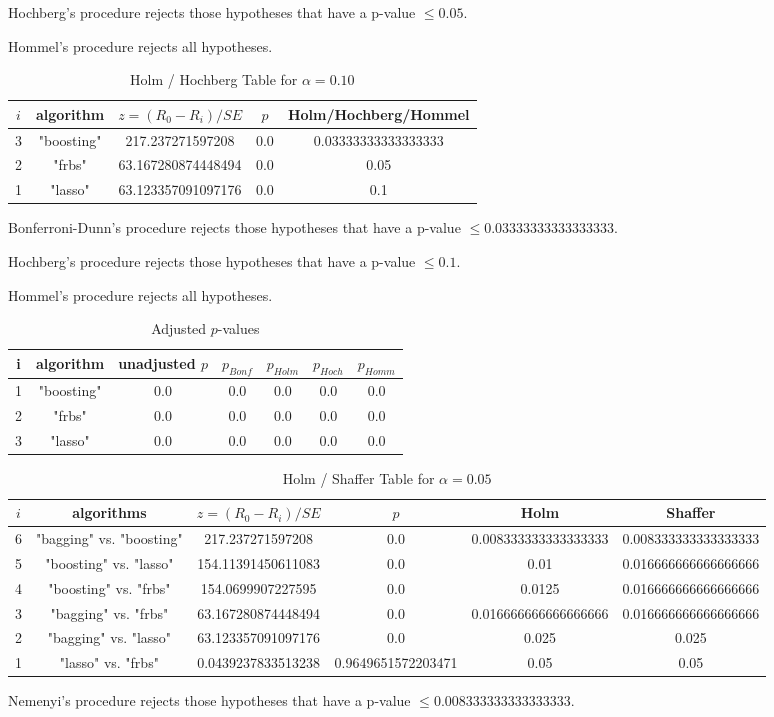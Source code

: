 \documentclass[a4paper,10pt]{article}
\begin{document}
\begin{landscape}
Hochberg's procedure rejects those hypotheses that have a p-value $\le0.05$.


Hommel's procedure rejects all hypotheses.


\begin{table}[!htp]
\centering\tiny
\caption{Holm / Hochberg Table for $\alpha=0.10$}
\begin{tabular}{ccccc}
$i$&algorithm&$z=(R_0 - R_i)/SE$&$p$&Holm/Hochberg/Hommel\\
\hline
3&"boosting"&217.237271597208&0.0&0.03333333333333333\\
2&"frbs"&63.167280874448494&0.0&0.05\\
1&"lasso"&63.123357091097176&0.0&0.1\\
\hline
\end{tabular}
\end{table}
Bonferroni-Dunn's procedure rejects those hypotheses that have a p-value $\le0.03333333333333333$.


Hochberg's procedure rejects those hypotheses that have a p-value $\le0.1$.


Hommel's procedure rejects all hypotheses.


\begin{table}[!htp]
\centering\tiny
\caption{Adjusted $p$-values}
\begin{tabular}{ccccccc}
i&algorithm&unadjusted $p$&$p_{Bonf}$&$p_{Holm}$&$p_{Hoch}$&$p_{Homm}$\\
\hline
1&"boosting"&0.0&0.0&0.0&0.0&0.0\\
2&"frbs"&0.0&0.0&0.0&0.0&0.0\\
3&"lasso"&0.0&0.0&0.0&0.0&0.0\\
\hline
\end{tabular}
\end{table}

\begin{table}[!htp]
\centering\tiny
\caption{Holm / Shaffer Table for $\alpha=0.05$}
\begin{tabular}{cccccc}
$i$&algorithms&$z=(R_0 - R_i)/SE$&$p$&Holm&Shaffer\\
\hline
6&"bagging" vs. "boosting"&217.237271597208&0.0&0.008333333333333333&0.008333333333333333\\
5&"boosting" vs. "lasso"&154.11391450611083&0.0&0.01&0.016666666666666666\\
4&"boosting" vs. "frbs"&154.0699907227595&0.0&0.0125&0.016666666666666666\\
3&"bagging" vs. "frbs"&63.167280874448494&0.0&0.016666666666666666&0.016666666666666666\\
2&"bagging" vs. "lasso"&63.123357091097176&0.0&0.025&0.025\\
1&"lasso" vs. "frbs"&0.0439237833513238&0.9649651572203471&0.05&0.05\\
\hline
\end{tabular}
\end{table}
Nemenyi's procedure rejects those hypotheses that have a p-value $\le0.008333333333333333$.



\end{landscape}
\end{document}
